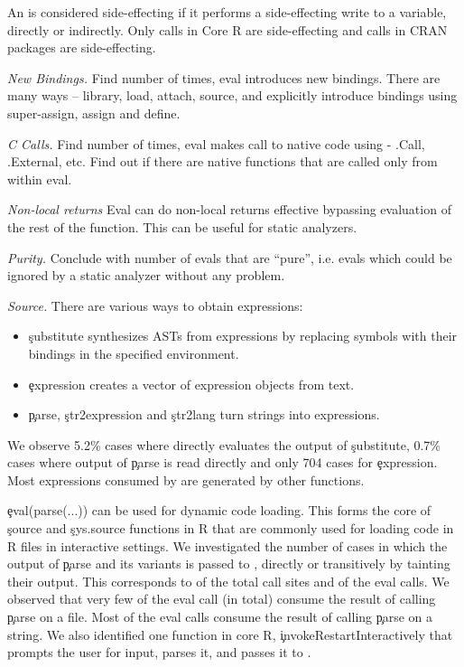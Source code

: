 \documentclass[screen,acmsmall]{acmart}
\newcommand{\mypara}[1]{\medskip\noindent\emph{#1}\xspace}
\begin{document}
An \eval is considered side-effecting if it performs a side-effecting
write to a variable, directly or indirectly. Only
\SideEffectingCoreCallPerc \eval calls in Core R are side-effecting
and \SideEffectingPackageCallPerc \eval calls in CRAN packages are
side-effecting.


\mypara{New Bindings.} Find number of times, eval introduces new
bindings. There are many ways -- library, load, attach, source, and
explicitly introduce bindings using super-assign, assign and define.

\mypara{C Calls.} Find number of times, eval makes call to native code
using - .Call, .External, etc. Find out if there are native functions
that are called only from within eval.

\mypara{Non-local returns}
Eval can do non-local returns effective bypassing evaluation of the
rest of the function. This can be useful for static analyzers.

\mypara{Purity.}
Conclude with number of evals that are ``pure'', i.e. evals which
could be ignored by a static analyzer without any problem.

\mypara{Source.}
There are various ways to obtain expressions:
\begin{itemize}
  \item \c{substitute} synthesizes ASTs from expressions by replacing
    symbols with their bindings in the specified environment.
  \item \c{expression}  creates a vector of expression
    objects from text.
  \item \c{parse}, \c{str2expression} and \c{str2lang} turn strings into
    expressions.
\end{itemize}

We observe 5.2\% cases where \eval directly evaluates the output of
\c{substitute}, 0.7\% cases where output of \c{parse} is read directly
and only 704 cases for \c{expression}. Most expressions consumed by
\eval are generated by other functions.

\c{eval(parse(...))} can be used for dynamic code loading. This forms
the core of \c{source} and \c{sys.source} functions in R that are
commonly used for loading code in R files in interactive settings. We
investigated the number of cases in which the output of \c{parse} and
its variants is passed to \eval, directly or transitively by tainting
their output. This corresponds to \PercentParsedCallSites of the total
\eval call sites and \PercentParsedEvals of the eval calls. We
observed that very few of the eval call (\NbParseFilesRnd in total)
consume the result of calling \c{parse} on a file. Most of the eval
calls consume the result of calling \c{parse} on a string. We also
identified one function in core R, \c{invokeRestartInteractively} that
prompts the user for input, parses it, and passes it to \eval.
\end{document}
